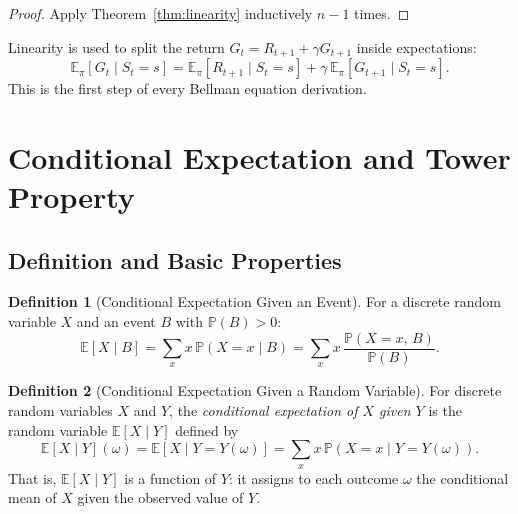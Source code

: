 \documentclass[11pt,a4paper]{article}
\theoremstyle{definition}
\newtheorem{definition}{Definition}[section]
\theoremstyle{plain}
\theoremstyle{remark}
\newcommand{\E}{\mathbb{E}}
\newcommand{\Prob}{\mathbb{P}}
\begin{document}
\begin{proof}
Apply Theorem~\ref{thm:linearity} inductively $n-1$ times.
\end{proof}

\begin{tdconnection}
Linearity is used to split the return $G_t = R_{t+1} + \gamma G_{t+1}$ inside expectations:
\[
    \E_\pi[G_t \mid S_t = s] = \E_\pi[R_{t+1} \mid S_t = s] + \gamma\,\E_\pi[G_{t+1} \mid S_t = s].
\]
This is the first step of every Bellman equation derivation.
\end{tdconnection}

\section{Conditional Expectation and Tower Property}
\label{sec:conditional}

\subsection{Definition and Basic Properties}
\label{subsec:cond_def}

\begin{definition}[Conditional Expectation Given an Event]
\label{def:cond_exp_event}
For a discrete random variable $X$ and an event $B$ with $\Prob(B) > 0$:
\begin{equation}
    \E[X \mid B] = \sum_x x\, \Prob(X = x \mid B) = \sum_x x\, \frac{\Prob(X = x,\, B)}{\Prob(B)}.
    \label{eq:cond_exp_event}
\end{equation}
\end{definition}

\begin{definition}[Conditional Expectation Given a Random Variable]
\label{def:cond_exp_rv}
For discrete random variables $X$ and $Y$, the \emph{conditional expectation of $X$ given $Y$} is the random variable $\E[X \mid Y]$ defined by
\begin{equation}
    \E[X \mid Y](\omega) = \E[X \mid Y = Y(\omega)] = \sum_x x\, \Prob(X = x \mid Y = Y(\omega)).
    \label{eq:cond_exp_rv}
\end{equation}
That is, $\E[X \mid Y]$ is a function of $Y$: it assigns to each outcome $\omega$ the conditional mean of $X$ given the observed value of $Y$.
\end{definition}
\end{document}
